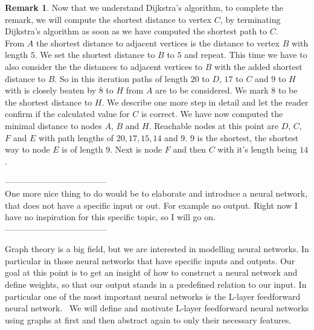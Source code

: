 \documentclass{article}
\theoremstyle{definition}
\newtheorem{example}[theorem]{Remark}
\begin{document}
\begin{example}
Now that we understand Dijkstra's algorithm, to complete the remark, we will compute the shortest distance to vertex $C$, by terminating Dijkstra's algorithm as soon as we have computed the shortest path to $C$. \\
From $A$ the shortest distance to adjacent vertices is the distance to vertex $B$ with length $5$. We set the shortest distance to $B$ to $5$ and repeat. This time we have to also consider the the distances to adjacent vertices to $B$ with the added shortest distance to $B$. So in this iteration paths of length $20$ to $D$, $17$ to $C$ and $9$ to $H$ with is closely beaten by $8$ to $H$ from $A$ are to be considered. We mark $8$ to be the shortest distance to $H$. We describe one more step in detail and let the reader confirm if the calculated value for $C$ is correct. We have now computed the minimal distance to nodes $A$, $B$ and $H$. Reachable nodes at this point are $D$, $C$, $F$ and $E$ with path lengths of $20, 17, 15, 14$ and $9$. $9$ is the shortest, the shortest way to node $E$ is of length $9$. Next is node $F$ and then $C$ with it's length being $14$.

\end{example}

------------------------------------ \\
One more nice thing to do would be to elaborate and introduce a neural network, that does not have a specific input or out. For example no output. Right now I have no inspiration for this specific topic, so I will go on. \\
------------------------------------

Graph theory is a big field, but we are interested in modelling neural networks. In particular in those neural networks that have specific inputs and outputs. Our goal at this point is to get an insight of how to construct a neural network and define weights, so that our output stands in a predefined relation to our input.
In particular one of the most important neural networks is the L-layer feedforward neural network. \
We will define and motivate L-layer feedforward neural networks using graphs at first and then abstract again to only their necessary features.
\end{document}
